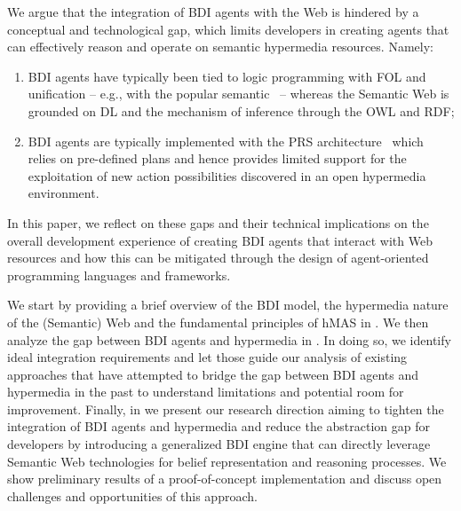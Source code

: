 \documentclass[
]{ceurart}
\begin{document}
We argue that the integration of \ac{BDI} agents with the Web
is hindered by a conceptual and technological gap, 
which limits developers in creating agents that can effectively reason and operate on semantic hypermedia resources.
Namely:
\begin{enumerate}[label={\roman*)}]
  \item \ac{BDI} agents have typically been tied to logic programming with \ac{FOL} and unification -- e.g., with the popular \agentspeak{} semantic~\cite{DBLP:conf/maamaw/Rao96} --
  whereas the Semantic Web is grounded on \ac{DL} and the mechanism of inference through the \ac{OWL} and \ac{RDF};
  \label{itm:gap-logic}
  \item \ac{BDI} agents are typically implemented with the \ac{PRS} architecture~\cite{georgeff1986pieee} which relies on pre-defined plans and hence provides limited support for the exploitation of new action possibilities discovered in an open hypermedia environment.\label{itm:gap-planning}
\end{enumerate}

In this paper, we reflect on these gaps and their technical implications on the overall development experience of creating \ac{BDI} agents that interact with Web resources and how this can be mitigated through the design of agent-oriented programming languages and frameworks. 

We start by providing a brief overview of the \ac{BDI} model, the hypermedia nature of the (Semantic) Web and the fundamental principles of \ac{hMAS} in .
%
We then analyze the gap between \ac{BDI} agents and hypermedia in .
%
In doing so,
we identify ideal integration requirements and let those guide our analysis of existing approaches that have attempted to bridge the gap between \ac{BDI} agents and hypermedia in the past to understand limitations and potential room for improvement.
%
Finally, in  we present our research direction
aiming to tighten the integration of \ac{BDI} agents and hypermedia
and reduce the abstraction gap for developers 
by introducing a generalized \ac{BDI} engine
that can directly leverage Semantic Web technologies for belief representation and reasoning processes.
%
We show preliminary results of a proof-of-concept implementation
and discuss open challenges and opportunities of this approach.

\end{document}
